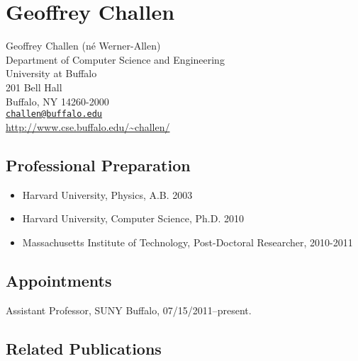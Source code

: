 \chapter{Geoffrey Challen}

Geoffrey Challen (n\'{e} Werner-Allen)\\
Department of Computer Science and Engineering\\
University at Buffalo\\
201 Bell Hall\\
Buffalo, NY 14260-2000\\
\href{mailto:challen@buffalo.edu}{\texttt{challen@buffalo.edu}}\\
\url{http://www.cse.buffalo.edu/~challen/}

\section{Professional Preparation}

\begin{itemize}
\item Harvard University, Physics, A.B. 2003
\item Harvard University, Computer Science, Ph.D. 2010
\item Massachusetts Institute of Technology, Post-Doctoral Researcher, 2010-2011
\end{itemize}

\section{Appointments}

Assistant Professor, SUNY Buffalo, 07/15/2011--present.

\section{Related Publications}

